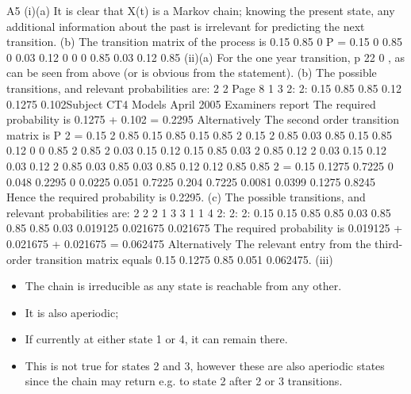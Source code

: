 \documentclass[a4paper,12pt]{article}
\begin{document}
\begin{enumerate}
\newpage 
A5
(i)(a) It is clear that X(t) is a Markov chain; knowing the present state, any
additional information about the past is irrelevant for predicting the next
transition.
(b)
The transition matrix of the process is
0.15 0.85 0
P =
0.15 0
0.85 0
0.03 0.12 0
0
0
0.85
0.03 0.12 0.85
(ii)(a) For the one year transition, p 22 0 ,
as can be seen from above (or is obvious from the statement).
(b)
The possible transitions, and relevant probabilities are:
2
2
Page 8
1
3
2:
2:
0.15 0.85
0.85 0.12
0.1275
0.102Subject CT4
Models
April 2005
Examiners report
\newpage The required probability is 0.1275 + 0.102 = 0.2295
Alternatively
The second order transition matrix is
P 2 =
0.15 2 0.85 0.15 0.85 0.15
0.85 2
0.15 2 0.85 0.03 0.85 0.15 0.85 0.12 0
0
0.85 2
0.85 2
0.03 0.15 0.12 0.15 0.85 0.03 2 0.85 0.12 2
0.03 0.15 0.12 0.03 0.12 2 0.85 0.03 0.85 0.03 0.85 0.12 0.12 0.85 0.85 2
=
0.15 0.1275 0.7225 0
0.048 0.2295 0
0.0225 0.051
0.7225
0.204
0.7225
0.0081 0.0399 0.1275 0.8245
Hence the required probability is 0.2295.
(c)
The possible transitions, and relevant probabilities are:
2
2
2
1
3
3
1
1
4
2:
2:
2:
0.15 0.15 0.85
0.85 0.03 0.85
0.85 0.85 0.03
0.019125
0.021675
0.021675
The required probability is
0.019125 + 0.021675 + 0.021675 = 0.062475
Alternatively
The relevant entry from the third-order transition matrix equals
0.15 0.1275 0.85 0.051 0.062475.
(iii)
\begin{itemize}
    \item The chain is irreducible as
any state is reachable from any other.
\item It is also aperiodic;
\item If currently at either state 1 or 4, it can remain there. 
\item This is not true for states
2 and 3, however these are also aperiodic states since the chain may return e.g.
to state 2 after 2 or 3 transitions.
\end{itemize}


\end{enumerate}
\end{document}
